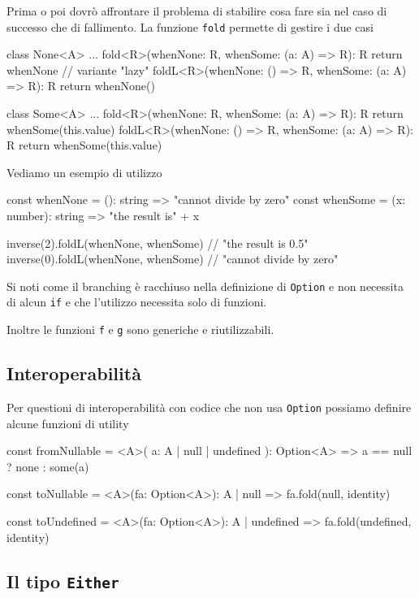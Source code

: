 \documentclass[12pt]{article}
\theoremstyle{definition}
\newenvironment{code}
  {\vspace{0.5cm} \VerbatimEnvironment\begin{typescriptcode}}
  {\end{typescriptcode} \vspace{0.2cm}}
\begin{document}
Prima o poi dovrò affrontare il problema di stabilire cosa fare sia nel caso di successo che di fallimento.
La funzione \texttt{fold} permette di gestire i due casi

\begin{code}
class None<A> {
  ...
  fold<R>(whenNone: R, whenSome: (a: A) => R): R {
    return whenNone
  }
  // variante "lazy"
  foldL<R>(whenNone: () => R, whenSome: (a: A) => R): R {
    return whenNone()
  }
}

class Some<A> {
  ...
  fold<R>(whenNone: R, whenSome: (a: A) => R): R {
    return whenSome(this.value)
  }
  foldL<R>(whenNone: () => R, whenSome: (a: A) => R): R {
    return whenSome(this.value)
  }
}
\end{code}

Vediamo un esempio di utilizzo

\begin{code}
const whenNone = (): string => "cannot divide by zero"
const whenSome = (x: number): string => "the result is" + x

inverse(2).foldL(whenNone, whenSome)
// "the result is 0.5"
inverse(0).foldL(whenNone, whenSome)
// "cannot divide by zero"
\end{code}

Si noti come il branching è racchiuso nella definizione di \texttt{Option} e non necessita di alcun \texttt{if}
e che l'utilizzo necessita solo di funzioni.

Inoltre le funzioni \texttt{f} e \texttt{g} sono generiche e riutilizzabili.

\subsection{Interoperabilità}

Per questioni di interoperabilità con codice che non usa \texttt{Option} possiamo definire alcune funzioni di utility

\begin{code}
const fromNullable = <A>(
  a: A | null | undefined
): Option<A> => a == null ? none : some(a)

const toNullable = <A>(fa: Option<A>): A | null =>
  fa.fold(null, identity)

const toUndefined = <A>(fa: Option<A>): A | undefined =>
  fa.fold(undefined, identity)
\end{code}

\subsection{Il tipo \texttt{Either}}
\end{document}
